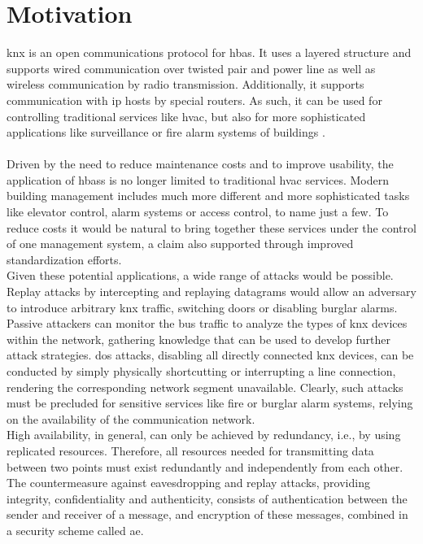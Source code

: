 \section{Motivation}

\gls{knx} is an open communications protocol for \gls{hbas}.
It uses a layered structure and supports wired communication over twisted pair
and power line as well as wireless communication by radio transmission. 
Additionally, it supports communication with \gls{ip} hosts by special routers. 
As such, it can be used for controlling traditional services like \gls{hvac}, but also for more
sophisticated applications like surveillance or fire alarm systems of buildings \cite{knxapps}.
\\
\\
Driven by the need to reduce maintenance costs and to improve usability, the application of \glspl{hbas} is no longer limited to traditional \gls{hvac} services.
Modern building management includes much more different and more sophisticated tasks like elevator control, alarm systems or access control, to name just a few.
To reduce costs it would be natural to bring together these services under the control of one management system, a claim also supported through improved 
standardization efforts.
\\
Given these potential applications, a wide range of attacks would be possible. 
Replay attacks by intercepting and replaying datagrams would allow an adversary to introduce arbitrary \gls{knx} traffic, switching doors
or disabling burglar alarms. Passive attackers can monitor the bus traffic to analyze the types of \gls{knx} devices within the network, gathering knowledge that can be used
to develop further attack strategies.
\gls{dos} attacks, disabling all directly connected \gls{knx} devices, can be conducted by simply physically shortcutting or interrupting a line
connection, rendering the corresponding network segment unavailable. Clearly, such attacks must be precluded for sensitive services like fire or burglar alarm systems,
relying on the availability of the communication network.
\\
High availability, in general, can only be achieved by redundancy, i.e., by using replicated resources. Therefore, all
resources needed for transmitting data between two points must exist redundantly and independently from each other.
\\
The countermeasure against eavesdropping and replay attacks, providing integrity, confidentiality and authenticity, consists of authentication
between the sender and receiver of a message, and encryption of these messages, combined in a security scheme called \gls{ae}.
